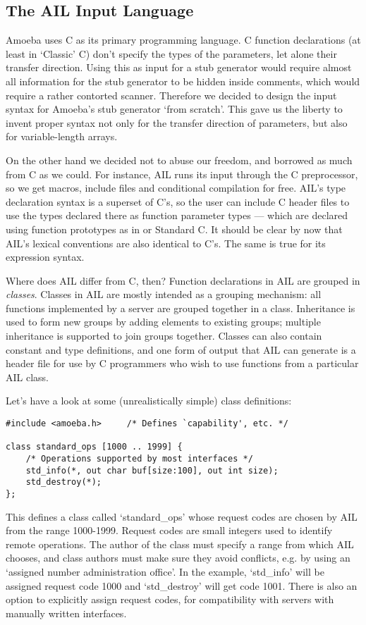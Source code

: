 \subsection{The AIL Input Language}

Amoeba uses C as its primary programming language.  C function
declarations (at least in `Classic' C) don't specify the types of
the parameters, let alone their transfer direction.  Using this as
input for a stub generator would require almost all information for
the stub generator to be hidden inside comments, which would require a
rather contorted scanner.  Therefore we decided to design the input
syntax for Amoeba's stub generator `from scratch'.  This gave us the
liberty to invent proper syntax not only for the transfer direction of
parameters, but also for variable-length arrays.

On the other hand we decided not to abuse our freedom, and borrowed as
much from C as we could.  For instance, AIL runs its input through the
C preprocessor, so we get macros, include files and conditional
compilation for free.  AIL's type declaration syntax is a superset of
C's, so the user can include C header files to use the types declared
there as function parameter types --- which are declared using
function prototypes as in \Cpp{} or Standard C\@.  It should be clear by
now that AIL's lexical conventions are also identical to C's.  The
same is true for its expression syntax.

Where does AIL differ from C, then?  Function declarations in AIL are
grouped in {\em classes}.  Classes in AIL are mostly intended as a
grouping mechanism: all functions implemented by a server are grouped
together in a class.  Inheritance is used to form new groups by adding
elements to existing groups; multiple inheritance is supported to join
groups together.  Classes can also contain constant and type
definitions, and one form of output that AIL can generate is a header
file for use by C programmers who wish to use functions from a
particular AIL class.

Let's have a look at some (unrealistically simple) class definitions:
\begin{verbatim}
#include <amoeba.h>     /* Defines `capability', etc. */

class standard_ops [1000 .. 1999] {
    /* Operations supported by most interfaces */
    std_info(*, out char buf[size:100], out int size);
    std_destroy(*);
};
\end{verbatim}
This defines a class called `standard\_ops' whose request codes are
chosen by AIL from the range 1000-1999.  Request codes are small
integers used to identify remote operations.  The author of the class
must specify a range from which AIL chooses, and class authors must
make sure they avoid conflicts, e.g. by using an `assigned number
administration office'.  In the example, `std\_info' will be assigned
request code 1000 and `std\_destroy' will get code 1001.  There is
also an option to explicitly assign request codes, for compatibility
with servers with manually written interfaces.

